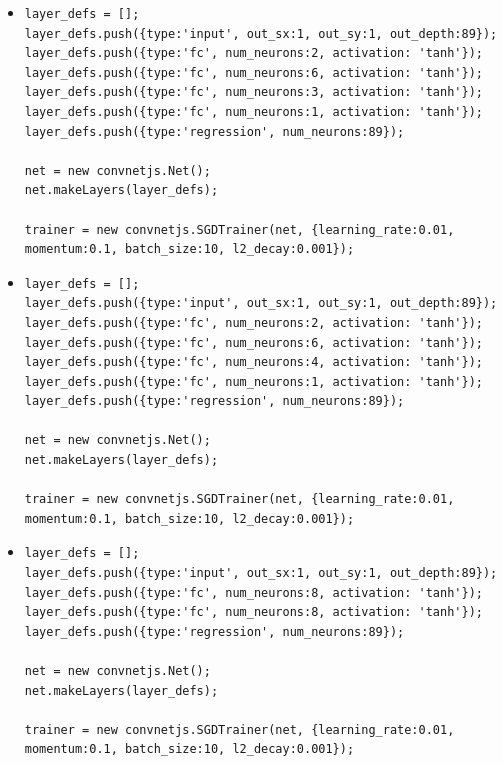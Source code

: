\begin{itemize}
\item \begin{verbatim}
layer_defs = [];
layer_defs.push({type:'input', out_sx:1, out_sy:1, out_depth:89});
layer_defs.push({type:'fc', num_neurons:2, activation: 'tanh'});
layer_defs.push({type:'fc', num_neurons:6, activation: 'tanh'});
layer_defs.push({type:'fc', num_neurons:3, activation: 'tanh'});
layer_defs.push({type:'fc', num_neurons:1, activation: 'tanh'});
layer_defs.push({type:'regression', num_neurons:89});

net = new convnetjs.Net();
net.makeLayers(layer_defs);

trainer = new convnetjs.SGDTrainer(net, {learning_rate:0.01, 
momentum:0.1, batch_size:10, l2_decay:0.001});
\end{verbatim}

\item \begin{verbatim}
layer_defs = [];
layer_defs.push({type:'input', out_sx:1, out_sy:1, out_depth:89});
layer_defs.push({type:'fc', num_neurons:2, activation: 'tanh'});
layer_defs.push({type:'fc', num_neurons:6, activation: 'tanh'});
layer_defs.push({type:'fc', num_neurons:4, activation: 'tanh'});
layer_defs.push({type:'fc', num_neurons:1, activation: 'tanh'});
layer_defs.push({type:'regression', num_neurons:89});

net = new convnetjs.Net();
net.makeLayers(layer_defs);

trainer = new convnetjs.SGDTrainer(net, {learning_rate:0.01, 
momentum:0.1, batch_size:10, l2_decay:0.001});
\end{verbatim}


\item \begin{verbatim}
layer_defs = [];
layer_defs.push({type:'input', out_sx:1, out_sy:1, out_depth:89});
layer_defs.push({type:'fc', num_neurons:8, activation: 'tanh'});
layer_defs.push({type:'fc', num_neurons:8, activation: 'tanh'});
layer_defs.push({type:'regression', num_neurons:89});

net = new convnetjs.Net();
net.makeLayers(layer_defs);

trainer = new convnetjs.SGDTrainer(net, {learning_rate:0.01, 
momentum:0.1, batch_size:10, l2_decay:0.001});
\end{verbatim}
\end{itemize}

